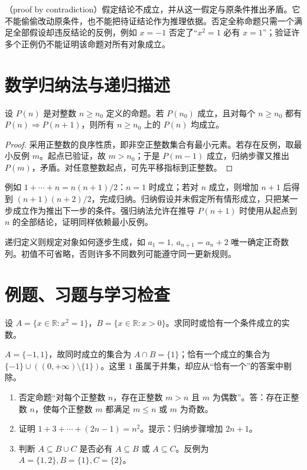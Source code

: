 \documentclass[UTF8]{ctexbook}
\begin{document}
（proof by contradiction）假定结论不成立，并从这一假定与原条件推出矛盾。它不能偷偷改动原条件，也不能把待证结论作为推理依据。否定全称命题只需一个满足全部假设却违反结论的反例，例如 $x=-1$ 否定了“$x^2=1$ 必有 $x=1$”；验证许多个正例仍不能证明该命题对所有对象成立。

\section{数学归纳法与递归描述}
\begin{theorem}[数学归纳法]
设 $P(n)$ 是对整数 $n\ge n_0$ 定义的命题。若 $P(n_0)$ 成立，且对每个 $n\ge n_0$ 都有 $P(n)\Rightarrow P(n+1)$，则所有 $n\ge n_0$ 上的 $P(n)$ 均成立。
\end{theorem}
\begin{proof}
采用正整数的良序性质，即非空正整数集合有最小元素。若存在反例，取最小反例 $m$。起点已验证，故 $m>n_0$；于是 $P(m-1)$ 成立，归纳步骤又推出 $P(m)$，矛盾。对任意整数起点，可先平移指标到正整数。
\end{proof}
例如 $1+\cdots+n=n(n+1)/2$：$n=1$ 时成立；若对 $n$ 成立，则增加 $n+1$ 后得到 $(n+1)(n+2)/2$，完成归纳。归纳假设并未假定所有情形成立，只把某一步成立作为推出下一步的条件。强归纳法允许在推导 $P(n+1)$ 时使用从起点到 $n$ 的全部结论，证明同样依赖最小反例。

递归定义则规定对象如何逐步生成，如 $a_1=1,\ a_{n+1}=a_n+2$ 唯一确定正奇数列。初值不可省略，否则许多不同数列可能遵守同一更新规则。

\section{例题、习题与学习检查}
\begin{example}
设 $A=\{x\in\mathbb R:x^2=1\}$，$B=\{x\in\mathbb R:x>0\}$。求同时或恰有一个条件成立的实数。
\end{example}
\begin{solve}
$A=\{-1,1\}$，故同时成立的集合为 $A\cap B=\{1\}$；恰有一个成立的集合为 $\{-1\}\cup((0,+\infty)\setminus\{1\})$。这里 $1$ 虽属于并集，却应从“恰有一个”的答案中剔除。
\end{solve}
\begin{enumerate}
\item 否定命题“对每个正整数 $n$，存在正整数 $m>n$ 且 $m$ 为偶数”。答：存在正整数 $n$，使每个正整数 $m$ 都满足 $m\le n$ 或 $m$ 为奇数。
\item 证明 $1+3+\cdots+(2n-1)=n^2$。提示：归纳步骤增加 $2n+1$。
\item 判断 $A\subseteq B\cup C$ 是否必有 $A\subseteq B$ 或 $A\subseteq C$。反例为 $A=\{1,2\},B=\{1\},C=\{2\}$。
\end{enumerate}
\end{document}

